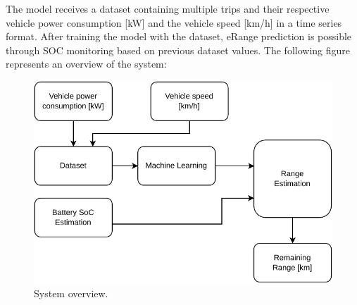 The model receives a \gls{dataset} containing multiple
trips and their respective vehicle power consumption [kW]
and the vehicle speed [km/h] in a  time series format.
After training the model with the dataset,
\gls{eRange} prediction is possible through
\gls{SOC} monitoring based on previous \gls{dataset} values.
The following figure represents an overview of the system:

\begin{figure}[H]
    \begin{center}
        \includegraphics[scale=1.0]{../figures/generic_diagram}
        \caption{System overview.}
    \end{center}
\end{figure}